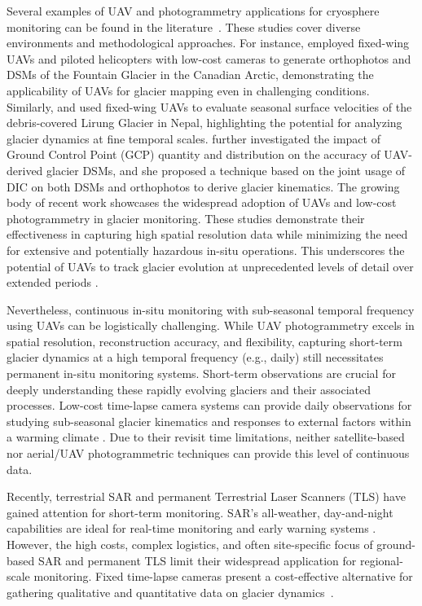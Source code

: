 Several examples of UAV and photogrammetry applications for cryosphere monitoring can be found in the literature~\citep{Bhardwaj2016, Gaffey2020}.
These studies cover diverse environments and methodological approaches.
For instance, \citet{Whitehead2013} employed fixed-wing UAVs and piloted helicopters with low-cost cameras to generate orthophotos and DSMs of the Fountain Glacier in the Canadian Arctic, demonstrating the applicability of UAVs for glacier mapping even in challenging conditions. 
Similarly, \citet{immerzeel2014} and \citet{kraaijenbrink2016} used fixed-wing UAVs to evaluate seasonal surface velocities of the debris-covered Lirung Glacier in Nepal, highlighting the potential for analyzing glacier dynamics at fine temporal scales.
\citet{Gindraux2017} further investigated the impact of Ground Control Point (GCP) quantity and distribution on the accuracy of UAV-derived glacier DSMs, and she proposed a technique based on the joint usage of DIC on both DSMs and orthophotos to derive glacier kinematics.
The growing body of recent work \citep{Benoit2019, Chudley2019, Jouvet2020, Cao2021,  ioli2021mid, Lamsters2022, belloni2023} showcases the widespread adoption of UAVs and low-cost photogrammetry in glacier monitoring. 
These studies demonstrate their effectiveness in capturing high spatial resolution data while minimizing the need for extensive and potentially hazardous in-situ operations.
This underscores the potential of UAVs to track glacier evolution at unprecedented levels of detail over extended periods \citep{ioli2021mid, belloni2023}.

Nevertheless, continuous in-situ monitoring with sub-seasonal temporal frequency using UAVs can be logistically challenging.
While UAV photogrammetry excels in spatial resolution, reconstruction accuracy, and flexibility, capturing short-term glacier dynamics at a high temporal frequency (e.g., daily) still necessitates permanent in-situ monitoring systems. 
Short-term observations are crucial for deeply understanding these rapidly evolving glaciers and their associated processes.
Low-cost time-lapse camera systems can provide daily observations for studying sub-seasonal glacier kinematics and responses to external factors within a warming climate \cite{Messerli2015}.  
Due to their revisit time limitations, neither satellite-based nor aerial/UAV photogrammetric techniques can provide this level of continuous data.

Recently, terrestrial SAR \cite{Strozzi2020} and permanent Terrestrial Laser Scanners (TLS) \cite{Hendrickx2022, Voordendag2023} have gained attention for short-term monitoring. 
SAR's all-weather, day-and-night capabilities are ideal for real-time monitoring and early warning systems \citep{Noferini2009, Dematteis2021}. 
However, the high costs, complex logistics, and often site-specific focus of ground-based SAR and permanent TLS limit their widespread application for regional-scale monitoring.
Fixed time-lapse cameras present a cost-effective alternative for gathering qualitative and quantitative data on glacier dynamics~\citep{Maas2006, Messerli2015, Giordan2016, James2016}.


